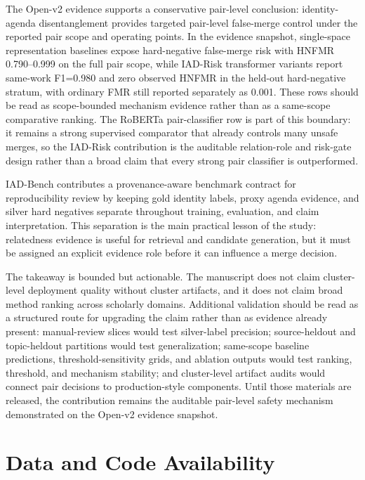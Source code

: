 \documentclass[11pt]{article}
\begin{document}
The Open-v2 evidence supports a conservative pair-level conclusion: identity-agenda disentanglement provides targeted pair-level false-merge control under the reported pair scope and operating points. In the evidence snapshot, single-space representation baselines expose hard-negative false-merge risk with HNFMR 0.790--0.999 on the full pair scope, while IAD-Risk transformer variants report same-work F1=0.980 and zero observed HNFMR in the held-out hard-negative stratum, with ordinary FMR still reported separately as 0.001. These rows should be read as scope-bounded mechanism evidence rather than as a same-scope comparative ranking. The RoBERTa pair-classifier row is part of this boundary: it remains a strong supervised comparator that already controls many unsafe merges, so the IAD-Risk contribution is the auditable relation-role and risk-gate design rather than a broad claim that every strong pair classifier is outperformed.

IAD-Bench contributes a provenance-aware benchmark contract for reproducibility review by keeping gold identity labels, proxy agenda evidence, and silver hard negatives separate throughout training, evaluation, and claim interpretation. This separation is the main practical lesson of the study: relatedness evidence is useful for retrieval and candidate generation, but it must be assigned an explicit evidence role before it can influence a merge decision.

The takeaway is bounded but actionable. The manuscript does not claim cluster-level deployment quality without cluster artifacts, and it does not claim broad method ranking across scholarly domains. Additional validation should be read as a structured route for upgrading the claim rather than as evidence already present: manual-review slices would test silver-label precision; source-heldout and topic-heldout partitions would test generalization; same-scope baseline predictions, threshold-sensitivity grids, and ablation outputs would test ranking, threshold, and mechanism stability; and cluster-level artifact audits would connect pair decisions to production-style components. Until those materials are released, the contribution remains the auditable pair-level safety mechanism demonstrated on the Open-v2 evidence snapshot.

\section*{Data and Code Availability}
\end{document}
